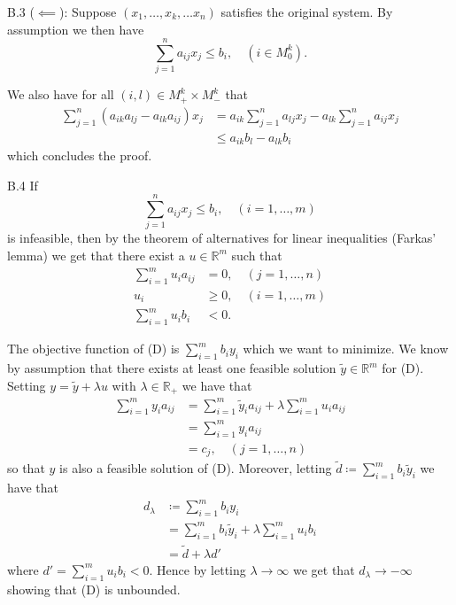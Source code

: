 \documentclass[a4paper]{article}
\begin{document}
\begin{exercise}{B.3}
    ($ \impliedby $): Suppose $ (x_1, \ldots,x_k,\ldots x_n) $ satisfies the original system. By assumption we then have
    \begin{equation*}
    \sum_{j = 1}^{n} a_{ij}x_j \leq b_i,\quad (i \in M_{0}^{k})
    .\end{equation*}

    We also have for all $ (i,l) \in M_{+}^{k} \times M_{-}^{k} $ that
    \begin{align*}
      \sum_{j = 1}^{n} (a_{ik}a_{lj} - a_{lk}a_{ij}) x_j &= a_{ik}\sum_{j = 1}^{n}a_{lj} x_j - a_{lk}\sum_{j = 1}^{n} a_{ij}x_j \\
                                                         &\leq a_{ik}b_l - a_{lk}b_i
    \end{align*}
    which concludes the proof.
  \end{exercise}

  \begin{exercise}{B.4}
    If
    \begin{equation*}
      \sum_{j = 1}^{n} a_{ij}x_j \leq b_i, \quad (i = 1,\ldots, m)
    \end{equation*}
    is infeasible, then by the theorem of alternatives for linear inequalities (Farkas' lemma) we get that there exist a $ u \in \mathbb{R}^{m} $ such that
    \begin{align*}
      \sum_{i = 1}^{m} u_i a_{ij} &= 0, \quad (j = 1,\ldots, n) \\
      u_i &\geq 0, \quad (i = 1, \ldots, m) \\
      \sum_{i = 1}^{m} u_ib_i &< 0
    .\end{align*}

    The objective function of (D) is $ \sum_{i = 1}^{m} b_iy_i $ which we want to minimize. We know by assumption that there exists at least one feasible solution $ \tilde{y} \in \mathbb{R}^{m} $ for (D). Setting $ y = \tilde{y} + \lambda u $ with $ \lambda \in \mathbb{R}_{+} $ we have that
    \begin{align*}
      \sum_{i = 1}^{m} y_i a_{ij} &= \sum_{i = 1}^{m} \tilde{y}_i a_{ij} + \lambda\sum_{i = 1}^{m}u_i a_{ij} \\
                                  &= \sum_{i = 1}^{m} y_i a_{ij} \\
                                  &= c_{j}, \quad (j = 1, \ldots, n)
    \end{align*}
    so that $ y $ is also a feasible solution of (D). Moreover, letting $ \tilde{d} \coloneqq  \sum_{i = 1}^{m}b_i \tilde{y}_i $ we have that
    \begin{align*}
      d_\lambda &\coloneqq \sum_{i = 1}^{m} b_i y_i \\
                &= \sum_{i = 1}^{m}b_i\tilde{y}_i + \lambda \sum_{i = 1}^{m}u_i b_i \\
                &= \tilde{d} + \lambda d'
    \end{align*}
    where $ d' = \sum_{i = 1}^{m} u_i b_i < 0 $. Hence by letting $ \lambda \to \infty $ we get that $ d_\lambda \to -\infty $ showing that (D) is unbounded.
  \end{exercise}
\end{document}
